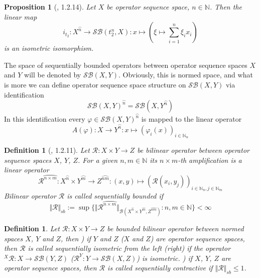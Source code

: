 \documentclass[12pt]{article}
\newtheorem{proposition}[theorem]{Proposition}
\newtheorem{definition}[theorem]{Definition}
\begin{document}
\begin{proposition}[\cite{LamOpFolgen}, 1.2.14]\label{PrSQSpaceIsSBFromT2n}
Let $X$ be operator sequence space, $n\in\mathbb{N}$. Then the linear map 
$$
i_{t_2}:X^{\wideparen{n}}\to\mathcal{SB}(t^n_2, X):x\mapsto\left(\xi\mapsto\sum\limits_{i=1}^n\xi_ix_i\right)
$$
is an isometric isomorphism.
\end{proposition}

The space of sequentially bounded operators between operator sequence spaces $X$ and $Y$ will be denoted by $\mathcal{SB}(X, Y)$. Obviously, this is normed space, and what is more we can define operator sequence space structure on $\mathcal{SB}(X, Y)$ via identification
$$
\mathcal{SB}(X, Y)^{\wideparen{n}} = \mathcal{SB}(X, Y^{\wideparen{n}})
$$
In this identification every $\varphi\in\mathcal{SB}(X,Y)^{\wideparen{n}}$ is mapped to the linear operator
$$
A(\varphi):X\to Y^{\wideparen{n}}:x\mapsto(\varphi_i(x))_{i\in\mathbb{N}_n}
$$

\begin{definition}[\cite{LamOpFolgen}, 1.2.11]\label{DefSBbiOp}
Let $\mathcal{R}:X\times Y\to Z$ be bilinear operator between operator sequence spaces $X$, $Y$, $Z$. For a given $n,m\in\mathbb{N}$ its $n\times m$-th amplification is a linear operator
$$
\mathcal{R}^{\wideparen{n\times m}}:X^{\wideparen{n}}\times Y^{\wideparen{m}}\to Z^{\wideparen{nm}}:(x,y)\mapsto(\mathcal{R}(x_i,y_j))_{i\in\mathbb{N}_n,j\in\mathbb{N}_m}
$$
Bilinear operator $\mathcal{R}$ is called sequentially bounded if
$$
\Vert\mathcal{R}\Vert_{sb}:=\sup\{\Vert \mathcal{R}^{\wideparen{n\times m}}\Vert_{\mathcal{B}(X^{\wideparen{n}}\times Y^{\wideparen{m}}, Z^{\wideparen{nm}})}:n,m\in\mathbb{N}\}<\infty
$$
\end{definition}

\begin{definition}\label{DefSBBiOpType}
Let $\mathcal{R}:X\times Y\to Z$ be bounded bilinear operator between normed spaces $X$, $Y$ and $Z$, then
) if $Y$ and $Z$ ($X$ and $Z$) are operator sequence spaces, then $\mathcal{R}$ is called sequentially isometric from the left (right) if the operator ${}^X\mathcal{R}:X\to\mathcal{SB}(Y,Z)$ ($\mathcal{R}^Y:Y\to\mathcal{SB}(X,Z)$) is isometric.
) if $X$, $Y$, $Z$ are operator sequence spaces, then $\mathcal{R}$ is called sequentially contractive if $\Vert \mathcal{R}\Vert_{sb}\leq 1$.
\end{definition}
\end{document}
